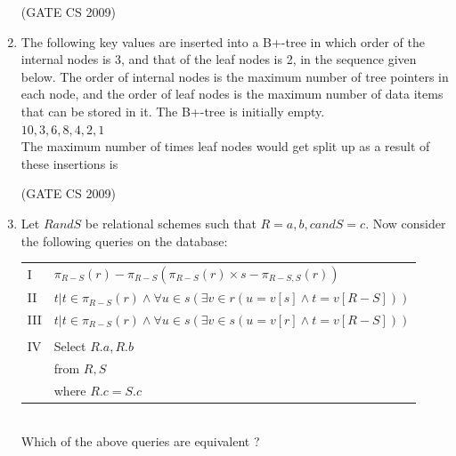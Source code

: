 \documentclass[a4paper, 11pt]{article}
\begin{document}
\begin{enumerate}
    \hfill (GATE CS 2009)

    \item The following key values are inserted into a B+-tree in which order of the internal nodes is 3, and that of the leaf nodes is 2, in the sequence given below. The order of internal nodes is the maximum number of tree pointers in each node, and the order of leaf nodes is the maximum number of data items that can be stored in it. The B+-tree is initially empty.\\
    $10, 3, 6, 8, 4, 2, 1$\\
    The maximum number of times leaf nodes would get split up as a result of these insertions is
    \begin{enumerate}
    \end{enumerate}

    \hfill (GATE CS 2009)

    \item Let $R and S$ be relational schemes such that $R= {a,b,c} and S = {c}$. Now consider the following queries on the database:\\
    \begin{tabular}{ll}
        I & $\pi_{R-S}(r)-\pi_{R-S}(\pi_{R-S}(r)\times s-\pi_{R-S,S}(r))$ \\
        II & ${t|t \in \pi_{R-S}(r) \land \forall u \in s(\exists v \in r(u=v[s] \land t=v[R-S]))}$\\
        III & ${t|t \in \pi_{R-S}(r) \land \forall u \in s(\exists v \in s(u=v[r] \land t=v[R-S]))}$\\ \\
        IV & Select $R.a, R.b$\\
           & from $R, S$\\
           & where $R.c=S.c$
    \end{tabular}\\

    Which of the above queries are equivalent ?
    \begin{enumerate}
    \end{enumerate}


\end{enumerate}
\end{document}
